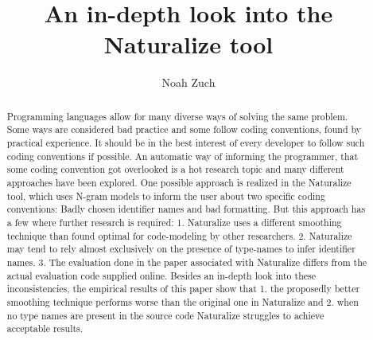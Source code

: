 \documentclass[sigconf]{acmart}
\begin{document}
\title{An in-depth look into the Naturalize tool}

\author{Noah Zuch}


\renewcommand{\shortauthors}{Noah Zuch}

\begin{abstract}
  Programming languages allow for many diverse ways of solving the same problem. Some ways are considered bad practice and some follow coding conventions, found by practical experience. It should be in the best interest of every developer to follow such coding conventions if possible.
  An automatic way of informing the programmer, that some coding convention got overlooked is a hot research topic and many different approaches have been explored. One possible approach is realized in the Naturalize tool, which uses N-gram models to inform the user about two specific coding conventions: Badly chosen identifier names and bad formatting. But this approach has a few where further research is required: 1. Naturalize uses a different smoothing technique than found optimal for code-modeling by other researchers. 2. Naturalize may tend to rely almost exclusively on the presence of type-names to infer identifier names. 3. The evaluation done in the paper associated with Naturalize differs from the actual evaluation code supplied online. Besides an in-depth look into these inconsistencies, the empirical results of this paper show that 1. the proposedly better smoothing technique performs worse than the original one in Naturalize and 2. when no type names are present in the source code Naturalize struggles to achieve acceptable results.
\end{abstract}
\end{document}
